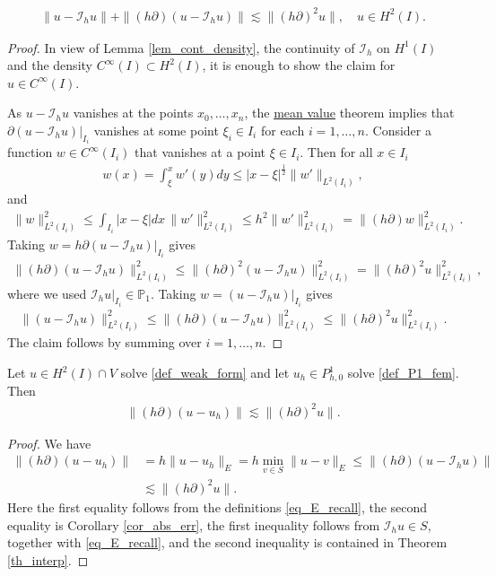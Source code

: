 \documentclass[12pt,oneside]{amsart}
\def\p{\partial}
\def\I{\mathcal I}
\begin{document}
\begin{theorem}\label{th_interp}
    \begin{align*}
\|u - \I_h u\| + \|(h\p)(u - \I_h u)\| \lesssim \|(h\p)^2 u\|, 
\quad u \in H^2(I). 
    \end{align*}
\end{theorem}
\begin{proof}
In view of Lemma \ref{lem_cont_density},
the continuity of $\I_h$ on $H^1(I)$ and the density $C^\infty(I) \subset H^2(I)$, it is enough to show the claim for $u \in C^\infty(I)$.

As $u - \I_h u$ vanishes at the points $x_0, \dots, x_n$,
the \href{https://en.wikipedia.org/wiki/Mean_value_theorem}{mean value} theorem implies that $\p (u - \I_h u)|_{I_i}$ vanishes at some point $\xi_i \in I_i$ for each $i=1,\dots,n$.
Consider a function $w \in C^\infty(I_i)$ that vanishes at a point $\xi \in I_i$. Then for all $x \in I_i$
    \begin{align*}
w(x) = \int_\xi^x w'(y) dy \le |x - \xi|^{\frac12} \|w'\|_{L^2(I_i)},
    \end{align*}
and
    \begin{align*}
\|w\|_{L^2(I_i)}^2 \le \int_{I_i} |x - \xi| dx\, \|w'\|_{L^2(I_i)}^2
\le h^2 \|w'\|_{L^2(I_i)}^2 = \|(h\p) w\|_{L^2(I_i)}^2.
    \end{align*}
Taking $w = h\p (u - \I_h u)|_{I_i}$ gives 
    \begin{align*}
\|(h\p)(u - \I_h u)\|_{L^2(I_i)}^2 
\le 
\|(h\p)^2 (u - \I_h u)\|_{L^2(I_i)}^2
= 
\|(h\p)^2 u\|_{L^2(I_i)}^2,
    \end{align*}
where we used $\I_h u|_{I_i} \in \mathbb P_1$.
Taking $w = (u - \I_h u)|_{I_i}$ gives
    \begin{align*}
\|(u - \I_h u)\|_{L^2(I_i)}^2 
\le 
\|(h\p)(u - \I_h u)\|_{L^2(I_i)}^2
\le 
\|(h\p)^2 u\|_{L^2(I_i)}^2.
    \end{align*}
The claim follows by summing over $i=1,\dots,n$.
\end{proof}

\begin{theorem}\label{th_err_deriv}
Let $u \in H^2(I) \cap V$ solve \eqref{def_weak_form}
and let $u_h \in P_{h,0}^1$ solve \eqref{def_P1_fem}.
Then
    \begin{align*}
\|(h\partial)(u-u_h)\|
\lesssim
\|(h \partial)^2 u\|.
    \end{align*}
\end{theorem}
\begin{proof}
We have
    \begin{align*}
\|(h\partial)(u-u_h)\|
&= 
h\|u-u_h\|_E 
= 
h \min_{v \in S}\|u-v\|_E
\le 
\|(h\partial)(u-\I_h u)\|
\\&\lesssim
\|(h \partial)^2 u\|.
    \end{align*}
Here the first equality follows from the definitions \eqref{eq_E_recall},
the second equality is Corollary \ref{cor_abs_err},
the first inequality follows from $\I_h u \in S$, together with \eqref{eq_E_recall}, and the second inequality is contained in Theorem \ref{th_interp}. 
\end{proof}
\end{document}
